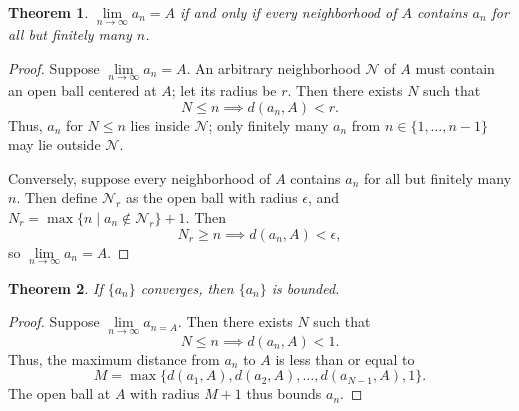 \documentclass[11pt]{article}
\newtheorem{theorem}{Theorem}
\begin{document}
\begin{theorem}
	$\lim\limits_{n \to \infty} a_{n} = A$ if and only if every neighborhood of $A$ contains $a_{n}$ for all but finitely many $n$.
\end{theorem}
\begin{adjustwidth}{0.5cm}{}
	\begin{proof}
		Suppose $\lim\limits_{n \to \infty} a_{n} = A$. An arbitrary neighborhood $\mathcal{N}$ of $A$ must contain an open ball centered at $A$; let its radius be $r$. Then there exists $N$ such that
		\[
			N \le n \implies d(a_{n}, A) < r.
		\]
		Thus, $a_{n}$ for $N \le n$ lies inside $\mathcal{N}$; only finitely many $a_{n}$ from $n \in \{ 1, \ldots, n - 1 \}$ may lie outside $\mathcal{N}$.

		Conversely, suppose every neighborhood of $A$ contains $a_{n}$ for all but finitely many $n$. Then define $\mathcal{N}_{r}$ as the open ball with radius $\epsilon$, and $N_{r} = \max \{ n \mid a_{n} \notin \mathcal{N}_{r} \} + 1$. Then
		\[
			N_{r} \ge n \implies d(a_{n}, A) < \epsilon,
		\]
		so $\lim\limits_{n \to \infty} a_{n} = A$.
	\end{proof}
\end{adjustwidth}

\newpage

\begin{theorem}
	If $\{ a_{n} \}$ converges, then $\{ a_{n} \}$ is bounded.
\end{theorem}
\begin{adjustwidth}{0.5cm}{}
	\begin{proof}
		Suppose $\lim\limits_{n \to \infty} a_{n = A}$. Then there exists $N$ such that
		\[
			N \le n \implies d(a_{n}, A) < 1.
		\]
		Thus, the maximum distance from $a_{n}$ to $A$ is less than or equal to
		\[
			M = \max \{ d(a_{1}, A), d(a_{2}, A), \ldots, d(a_{N - 1}, A), 1 \}.
		\]
		The open ball at $A$ with radius $M + 1$ thus bounds $a_{n}$.
	\end{proof}
\end{adjustwidth}
\end{document}
